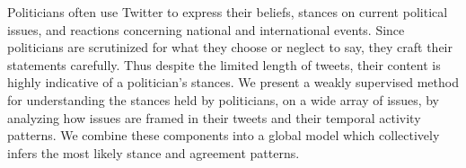 Politicians often use Twitter to express their beliefs, stances on current political issues, and reactions concerning national and international events. Since politicians are scrutinized for what they choose or neglect to say, they craft their statements carefully. Thus despite the limited length of tweets, their content is highly indicative of a politician's stances. We present a weakly supervised method for understanding the stances held by politicians, on a wide array of issues, by analyzing how issues are framed in their tweets and their temporal activity patterns. We combine these components into a global model which collectively infers the most likely stance and agreement patterns.
